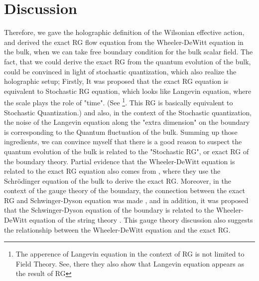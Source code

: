 \documentclass[12pt,epsbox]{article}
\numberwithin{equation}{section}
\begin{document}
\section{Discussion}
Therefore, we gave the holographic definition of the Wilsonian effective action, and derived the exact RG flow equation from the Wheeler-DeWitt equation in the bulk, when we can take free boundary condition for the bulk scalar field. The fact, that we could derive the exact RG from the quantum evolution of the bulk, could be convinced in light of stochastic quantization, which also realize the holographic setup; Firstly, It was proposed that the exact RG equation is equivalent to Stochastic RG equation, which looks like Langevin equation, where the scale plays the role of "time". (See \cite{Gaite}\footnote{The apperence of Langevin equation in the context of RG is not limited to Field Theory. See\cite{Oono}, there they also show that Langevin equation appears as the result of RG}. This RG is basically equivalent to Stochastic Quantization.) and also, in the context of the Stochastic quantization, %
the noise of the Langevin equation along the "extra dimension" on the boundary is corresponding to the Quantum fluctuation of the bulk. Summing up those ingredients, we can convince myself that there is a good reason to suspect the quantum evolution of the bulk is related to the "Stochastic RG", or exact RG of the boundary theory. Partial evidence that the Wheeler-DeWitt equation is related to the exact RG equation also comes from \cite{Polchinski}, where they use the Schr\"odinger equation of the bulk to derive the exact RG. Moreover, in the context of the gauge theory of the boundary, the connection between the exact RG and Schwinger-Dyson equation was made \cite{Hirano}, and in addition, it was proposed that the Schwinger-Dyson equation of the boundary is related to the Wheeler-DeWitt equation of the string theory \cite{Gilad}. This gauge theory discussion also suggests the relationship between the Wheeler-DeWitt equation and the exact RG.
\end{document}
